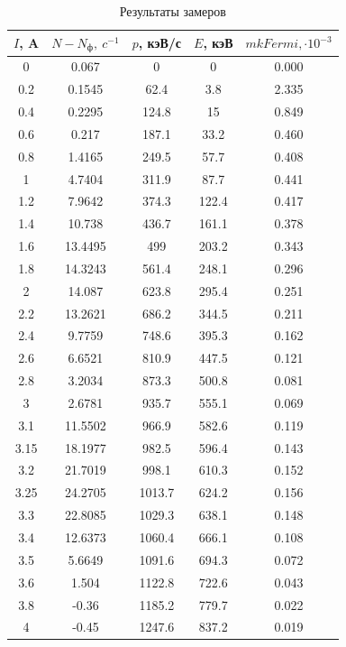 \documentclass[a4paper,12pt]{article} %
\begin{document}
	\begin{table}[H]
		\centering
		\begin{tabular}{|c|c|c|c|c|}
			\hline
			$I$, A & $N-N_{\text{ф}},~c^{-1}$    & $p$, кэВ/с & $E$, кэВ & $mkFermi, \cdot 10^{-3}$   \\ \hline
			0    & 0.067   & 0        & 0      & 0.000 \\ \hline
			0.2  & 0.1545  & 62.4     & 3.8    & 2.335 \\ \hline
			0.4  & 0.2295  & 124.8    & 15     & 0.849 \\ \hline
			0.6  & 0.217   & 187.1    & 33.2   & 0.460 \\ \hline
			0.8  & 1.4165  & 249.5    & 57.7   & 0.408 \\ \hline
			1    & 4.7404  & 311.9    & 87.7   & 0.441 \\ \hline
			1.2  & 7.9642  & 374.3    & 122.4  & 0.417 \\ \hline
			1.4  & 10.738  & 436.7    & 161.1  & 0.378 \\ \hline
			1.6  & 13.4495 & 499      & 203.2  & 0.343 \\ \hline
			1.8  & 14.3243 & 561.4    & 248.1  & 0.296 \\ \hline
			2    & 14.087  & 623.8    & 295.4  & 0.251 \\ \hline
			2.2  & 13.2621 & 686.2    & 344.5  & 0.211 \\ \hline
			2.4  & 9.7759  & 748.6    & 395.3  & 0.162 \\ \hline
			2.6  & 6.6521  & 810.9    & 447.5  & 0.121 \\ \hline
			2.8  & 3.2034  & 873.3    & 500.8  & 0.081 \\ \hline
			3    & 2.6781  & 935.7    & 555.1  & 0.069 \\ \hline
			3.1  & 11.5502 & 966.9    & 582.6  & 0.119 \\ \hline
			3.15 & 18.1977 & 982.5    & 596.4  & 0.143 \\ \hline
			3.2  & 21.7019 & 998.1    & 610.3  & 0.152 \\ \hline
			3.25 & 24.2705 & 1013.7   & 624.2  & 0.156 \\ \hline
			3.3  & 22.8085 & 1029.3   & 638.1  & 0.148 \\ \hline
			3.4  & 12.6373 & 1060.4   & 666.1  & 0.108 \\ \hline
			3.5  & 5.6649  & 1091.6   & 694.3  & 0.072 \\ \hline
			3.6  & 1.504   & 1122.8   & 722.6  & 0.043 \\ \hline
			3.8  & -0.36   & 1185.2   & 779.7  & 0.022 \\ \hline
			4    & -0.45   & 1247.6   & 837.2  & 0.019 \\ \hline
		\end{tabular}
	\caption{Результаты замеров}
	\end{table}
\end{document}
